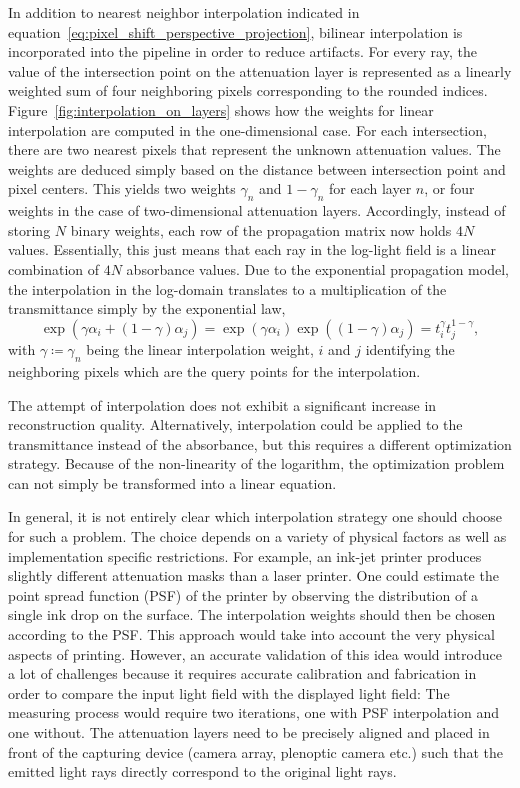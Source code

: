 In addition to nearest neighbor interpolation indicated in equation~\ref{eq:pixel_shift_perspective_projection}, bilinear interpolation is incorporated into the pipeline in order to reduce artifacts.
For every ray, the value of the intersection point on the attenuation layer is represented as a linearly weighted sum of four neighboring pixels corresponding to the rounded indices.
Figure~\ref{fig:interpolation_on_layers} shows how the weights for linear interpolation are computed in the one-dimensional case.
For each intersection, there are two nearest pixels that represent the unknown attenuation values.
The weights are deduced simply based on the distance between intersection point and pixel centers.
This yields two weights $\gamma_n$ and $1 - \gamma_n$ for each layer $n$, or four weights in the case of two-dimensional attenuation layers.
Accordingly, instead of storing $N$ binary weights, each row of the propagation matrix now holds $4 N$ values.
Essentially, this just means that each ray in the log-light field is a linear combination of $4 N$ absorbance values.
Due to the exponential propagation model, the interpolation in the log-domain translates to a multiplication of the transmittance simply by the exponential law,
\begin{equation*}	
	\exp( \gamma \alpha_i + (1 - \gamma) \alpha_j ) = \exp( \gamma \alpha_i ) \exp( (1 - \gamma) \alpha_j ) = t_i^{\gamma} t_j^{1 - \gamma},
\end{equation*}
with $\gamma \coloneqq \gamma_n$ being the linear interpolation weight, $i$ and $j$ identifying the neighboring pixels which are the query points for the interpolation.

The attempt of interpolation does not exhibit a significant increase in reconstruction quality.
Alternatively, interpolation could be applied to the transmittance instead of the absorbance, but this requires a different optimization strategy.
Because of the non-linearity of the logarithm, the optimization problem can not simply be transformed into a linear equation.

In general, it is not entirely clear which interpolation strategy one should choose for such a problem.
The choice depends on a variety of physical factors as well as implementation specific restrictions.
For example, an ink-jet printer produces slightly different attenuation masks than a laser printer.
One could estimate the point spread function (PSF) of the printer by observing the distribution of a single ink drop on the surface.
The interpolation weights should then be chosen according to the PSF.
This approach would take into account the very physical aspects of printing.
However, an accurate validation of this idea would introduce a lot of challenges because it requires accurate calibration and fabrication in order to compare the input light field with the displayed light field:
The measuring process would require two iterations, one with PSF interpolation and one without.
The attenuation layers need to be precisely aligned and placed in front of the capturing device (camera array, plenoptic camera etc.) such that the emitted light rays directly correspond to the original light rays.

